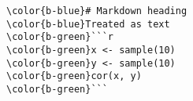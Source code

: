 \documentclass[class=minimal,border=0]{standalone}
\begin{document}
%
\begin{BVerbatim}[bgcolor=b-darkgrey]
\color{b-blue}# Markdown heading
\color{b-blue}Treated as text
\color{b-green}```r
\color{b-green}x <- sample(10)
\color{b-green}y <- sample(10)
\color{b-green}cor(x, y)
\color{b-green}```

\end{BVerbatim}
\end{document}
